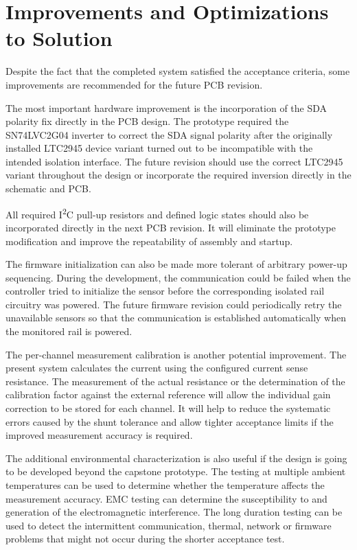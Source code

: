
\chapter{Improvements and Optimizations to Solution}
\label{chap:improvements}
Despite the fact that the completed system satisfied the acceptance criteria, some improvements are recommended for the future PCB revision.

The most important hardware improvement is the incorporation of the SDA polarity fix directly in the PCB design. The prototype required the SN74LVC2G04 inverter to correct the SDA signal polarity after the originally installed LTC2945 device variant turned out to be incompatible with the intended isolation interface. The future revision should use the correct LTC2945 variant throughout the design or incorporate the required inversion directly in the schematic and PCB.

All required I\textsuperscript{2}C pull-up resistors and defined logic states should also be incorporated directly in the next PCB revision. It will eliminate the prototype modification and improve the repeatability of assembly and startup.

The firmware initialization can also be made more tolerant of arbitrary power-up sequencing. During the development, the communication could be failed when the controller tried to initialize the sensor before the corresponding isolated rail circuitry was powered. The future firmware revision could periodically retry the unavailable sensors so that the communication is established automatically when the monitored rail is powered.

The per-channel measurement calibration is another potential improvement. The present system calculates the current using the configured current sense resistance. The measurement of the actual resistance or the determination of the calibration factor against the external reference will allow the individual gain correction to be stored for each channel. It will help to reduce the systematic errors caused by the shunt tolerance and allow tighter acceptance limits if the improved measurement accuracy is required.

The additional environmental characterization is also useful if the design is going to be developed beyond the capstone prototype. The testing at multiple ambient temperatures can be used to determine whether the temperature affects the measurement accuracy. EMC testing can determine the susceptibility to and generation of the electromagnetic interference. The long duration testing can be used to detect the intermittent communication, thermal, network or firmware problems that might not occur during the shorter acceptance test.

